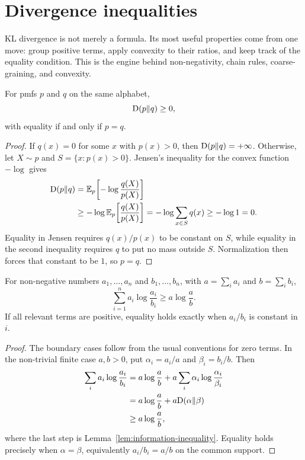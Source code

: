 \section{Divergence inequalities}\label{sec:divergence-properties}
\quad{}

\begin{strand}
KL divergence is not merely a formula. Its most useful properties come from one
move: group positive terms, apply convexity to their ratios, and keep track of
the equality condition. This is the engine behind non-negativity, chain rules,
coarse-graining, and convexity.
\end{strand}

\begin{lemma}\label{lem:information-inequality}
For pmfs $p$ and $q$ on the same alphabet,
\[
  \mathrm{D}(p\Vert q)\ge0,
\]
with equality if and only if $p=q$.
\end{lemma}

\begin{proof}
If $q(x)=0$ for some $x$ with $p(x)>0$, then
$\mathrm{D}(p\Vert q)=+\infty$. Otherwise, let $X\sim p$ and
$S=\{x:p(x)>0\}$. Jensen's inequality for the convex function $-\log$
gives
\begin{align*}
  \mathrm{D}(p\Vert q)
  &=\mathbb{E}_p\!\left[-\log\frac{q(X)}{p(X)}\right]\\
  &\ge-\log\mathbb{E}_p\!\left[\frac{q(X)}{p(X)}\right]
   =-\log\sum_{x\in S}q(x)
  \ge-\log1=0.
\end{align*}
Equality in Jensen requires $q(x)/p(x)$ to be constant on $S$, while equality
in the second inequality requires $q$ to put no mass outside $S$.
Normalization then forces that constant to be $1$, so $p=q$.
\end{proof}

\begin{theorem}\label{thm:log-sum}
For non-negative numbers $a_1,\ldots,a_n$ and $b_1,\ldots,b_n$, with
$a=\sum_i a_i$ and $b=\sum_i b_i$,
\[
  \sum_{i=1}^n a_i\log\frac{a_i}{b_i}
  \ge a\log\frac{a}{b}.
\]
If all relevant terms are positive, equality holds exactly when
$a_i/b_i$ is constant in $i$.
\end{theorem}

\begin{proof}
The boundary cases follow from the usual conventions for zero terms. In the
non-trivial finite case $a,b>0$, put
$\alpha_i=a_i/a$ and $\beta_i=b_i/b$. Then
\begin{align*}
  \sum_i a_i\log\frac{a_i}{b_i}
  &=a\log\frac{a}{b}
    +a\sum_i\alpha_i\log\frac{\alpha_i}{\beta_i}\\
  &=a\log\frac{a}{b}+a\mathrm{D}(\alpha\Vert\beta)\\
  &\ge a\log\frac{a}{b},
\end{align*}
where the last step is Lemma~\ref{lem:information-inequality}.
Equality holds precisely when $\alpha=\beta$, equivalently
$a_i/b_i=a/b$ on the common support.
\end{proof}

